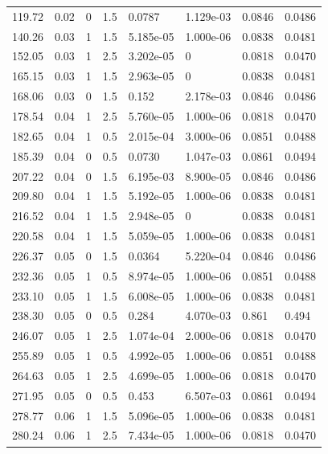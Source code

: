\documentclass[preview]{standalone}
\begin{document}
{{\begin{tabular}{L{1.2cm}C{1.2cm} C{0.3cm}C{0.5cm} C{1.4cm}C{1.4cm} C{1.4cm}C{1.4cm}}
  119.72  &  0.02  & 0     & 1.5 &  0.0787  & 1.129e-03  & 0.0846 &  0.0486   \\ 
  140.26  &  0.03  & 1     & 1.5 &  5.185e-05  & 1.000e-06  & 0.0838 &  0.0481   \\ 
  152.05  &  0.03  & 1     & 2.5 &  3.202e-05  & 0  & 0.0818 &  0.0470   \\ 
  165.15  &  0.03  & 1     & 1.5 &  2.963e-05  & 0  & 0.0838 &  0.0481   \\ 
  168.06  &  0.03  & 0     & 1.5 &  0.152  & 2.178e-03  & 0.0846 &  0.0486   \\ 
  178.54  &  0.04  & 1     & 2.5 &  5.760e-05  & 1.000e-06  & 0.0818 &  0.0470   \\ 
  182.65  &  0.04  & 1     & 0.5 &  2.015e-04  & 3.000e-06  & 0.0851 &  0.0488   \\ 
  185.39  &  0.04  & 0     & 0.5 &  0.0730  & 1.047e-03  & 0.0861 &  0.0494   \\ 
  207.22  &  0.04  & 0     & 1.5 &  6.195e-03  & 8.900e-05  & 0.0846 &  0.0486   \\ 
  209.80  &  0.04  & 1     & 1.5 &  5.192e-05  & 1.000e-06  & 0.0838 &  0.0481   \\ 
  216.52  &  0.04  & 1     & 1.5 &  2.948e-05  & 0  & 0.0838 &  0.0481   \\ 
  220.58  &  0.04  & 1     & 1.5 &  5.059e-05  & 1.000e-06  & 0.0838 &  0.0481   \\ 
  226.37  &  0.05  & 0     & 1.5 &  0.0364  & 5.220e-04  & 0.0846 &  0.0486   \\ 
  232.36  &  0.05  & 1     & 0.5 &  8.974e-05  & 1.000e-06  & 0.0851 &  0.0488   \\ 
  233.10  &  0.05  & 1     & 1.5 &  6.008e-05  & 1.000e-06  & 0.0838 &  0.0481   \\ 
  238.30  &  0.05  & 0     & 0.5 &  0.284  & 4.070e-03  & 0.861 &  0.494   \\ 
  246.07  &  0.05  & 1     & 2.5 &  1.074e-04  & 2.000e-06  & 0.0818 &  0.0470   \\ 
  255.89  &  0.05  & 1     & 0.5 &  4.992e-05  & 1.000e-06  & 0.0851 &  0.0488   \\ 
  264.63  &  0.05  & 1     & 2.5 &  4.699e-05  & 1.000e-06  & 0.0818 &  0.0470   \\ 
  271.95  &  0.05  & 0     & 0.5 &  0.453  & 6.507e-03  & 0.0861 &  0.0494   \\ 
  278.77  &  0.06  & 1     & 1.5 &  5.096e-05  & 1.000e-06  & 0.0838 &  0.0481   \\ 
  280.24  &  0.06  & 1     & 2.5 &  7.434e-05  & 1.000e-06  & 0.0818 &  0.0470   \\ 

\end{tabular}}}
\end{document}
